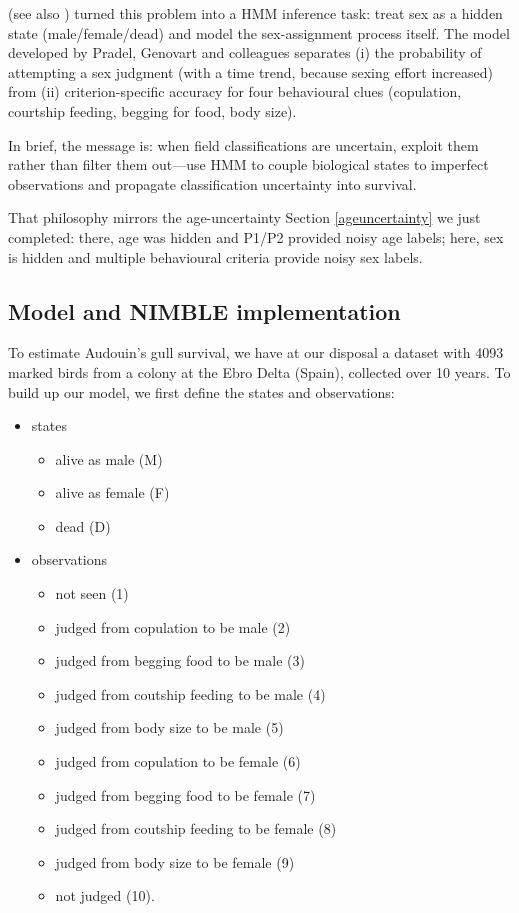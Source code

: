 \documentclass[
  12pt,
]{krantz}
\providecommand{\tightlist}{%
  \setlength{\itemsep}{0pt}\setlength{\parskip}{0pt}}
\begin{document}
\citet{pradel2008sex} (see also \citet{genovart_exploiting_2012}) turned this problem into a HMM inference task: treat sex as a hidden state (male/female/dead) and model the sex-assignment process itself. The model developed by Pradel, Genovart and colleagues separates (i) the probability of attempting a sex judgment (with a time trend, because sexing effort increased) from (ii) criterion-specific accuracy for four behavioural clues (copulation, courtship feeding, begging for food, body size).

In brief, the message is: when field classifications are uncertain, exploit them rather than filter them out---use HMM to couple biological states to imperfect observations and propagate classification uncertainty into survival.

That philosophy mirrors the age-uncertainty Section \ref{ageuncertainty} we just completed: there, age was hidden and P1/P2 provided noisy age labels; here, sex is hidden and multiple behavioural criteria provide noisy sex labels.

\subsection{Model and NIMBLE implementation}\label{model-and-nimble-implementation-2}

To estimate Audouin's gull survival, we have at our disposal a dataset with 4093 marked birds from a colony at the Ebro Delta (Spain), collected over 10 years. To build up our model, we first define the states and observations:

\begin{itemize}
\tightlist
\item
  states

  \begin{itemize}
  \tightlist
  \item
    alive as male (M)
  \item
    alive as female (F)
  \item
    dead (D)
  \end{itemize}
\item
  observations

  \begin{itemize}
  \tightlist
  \item
    not seen (1)
  \item
    judged from copulation to be male (2)
  \item
    judged from begging food to be male (3)
  \item
    judged from coutship feeding to be male (4)
  \item
    judged from body size to be male (5)
  \item
    judged from copulation to be female (6)
  \item
    judged from begging food to be female (7)
  \item
    judged from coutship feeding to be female (8)
  \item
    judged from body size to be female (9)
  \item
    not judged (10).
  \end{itemize}
\end{itemize}
\end{document}
